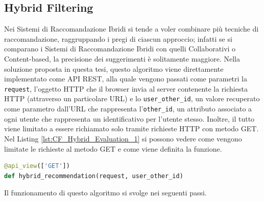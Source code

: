 \subsection{Hybrid Filtering} 
Nei Sistemi di Raccomandazione Ibridi si tende a voler combinare più tecniche di raccomandazione, raggruppando i 
pregi di ciascun approccio; infatti se si comparano i Sistemi di Raccomandazione Ibridi con quelli Collaborativi o 
Content-based, la precisione dei suggerimenti è solitamente maggiore.\hfill\break
Nella soluzione proposta in questa tesi, questo algoritmo viene direttamente implementato come API REST, alla quale vengono 
passati come parametri la \texttt{request}, l'oggetto HTTP che il browser invia al server contenente la richiesta HTTP 
(attraverso un particolare URL) e lo \texttt{user\_other\_id}, un valore recuperato come parametro dall'URL che rappresenta 
l'\texttt{other\_id}, un attributo associato a ogni utente che rappresenta un identificativo per l'utente stesso. Inoltre, il 
tutto viene limitato a essere richiamato solo tramite richieste HTTP con metodo GET.\hfill\break
Nel Listing \ref{lst:CF_Hybrid_Evaluation_1} si possono vedere come vengono limitate le richieste al metodo GET e come 
viene definita la funzione.
\begin{lstlisting}[language=Python, label=lst:CF_Hybrid_Evaluation_1, caption={Definizione della funzione che implementa l'algoritmo di 
    raccomndazione ibrido.}]
@api_view(['GET'])
def hybrid_recommendation(request, user_other_id)
\end{lstlisting} 
%
Il funzionamento di questo algoritmo si svolge nei seguenti passi.
